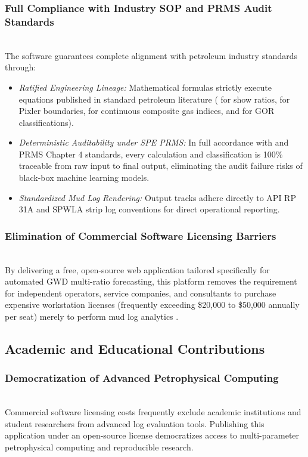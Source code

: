 \subsubsection{Full Compliance with Industry SOP and PRMS Audit Standards}~\\
The software guarantees complete alignment with petroleum industry standards through:
\begin{itemize}
    \item \textit{Ratified Engineering Lineage:} Mathematical formulas strictly execute equations published in standard petroleum literature (\citet{haworth1985} for show ratios, \citet{ref13} for Pixler boundaries, \citet{whittaker1991} for continuous composite gas indices, and \citet{spe2020} for GOR classifications).
    \item \textit{Deterministic Auditability under SPE PRMS:} In full accordance with \citet{ref2} and \citet{ref3} PRMS Chapter 4 standards, every calculation and classification is 100\% traceable from raw input to final output, eliminating the audit failure risks of black-box machine learning models.
    \item \textit{Standardized Mud Log Rendering:} Output tracks adhere directly to API RP 31A and SPWLA strip log conventions for direct operational reporting.
\end{itemize}

\subsubsection{Elimination of Commercial Software Licensing Barriers}~\\
By delivering a free, open-source web application tailored specifically for automated GWD multi-ratio forecasting, this platform removes the requirement for independent operators, service companies, and consultants to purchase expensive workstation licenses (frequently exceeding \$20,000 to \$50,000 annually per seat) merely to perform mud log analytics \citep{wood2020}.

\subsection{Academic and Educational Contributions}

\subsubsection{Democratization of Advanced Petrophysical Computing}~\\
Commercial software licensing costs frequently exclude academic institutions and student researchers from advanced log evaluation tools. Publishing this application under an open-source license democratizes access to multi-parameter petrophysical computing and reproducible research.

